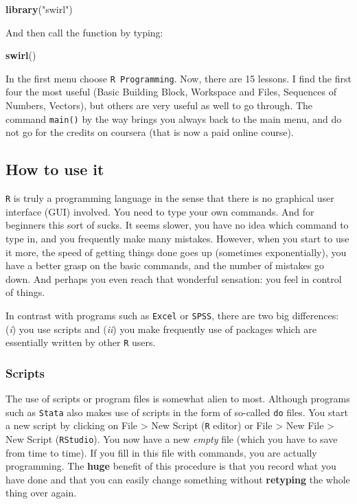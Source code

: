 \documentclass[]{article}
\newenvironment{Shaded}{\begin{snugshade}}{\end{snugshade}}
\newcommand{\KeywordTok}[1]{\textcolor[rgb]{0.13,0.29,0.53}{\textbf{#1}}}
\newcommand{\StringTok}[1]{\textcolor[rgb]{0.31,0.60,0.02}{#1}}
\newcommand{\NormalTok}[1]{#1}
\theoremstyle{definition}
\theoremstyle{definition}
\theoremstyle{definition}
\theoremstyle{remark}
\begin{document}
\begin{Shaded}
\begin{Highlighting}[]
\KeywordTok{library}\NormalTok{(}\StringTok{"swirl"}\NormalTok{)}
\end{Highlighting}
\end{Shaded}

And then call the function by typing:

\begin{Shaded}
\begin{Highlighting}[]
\KeywordTok{swirl}\NormalTok{()}
\end{Highlighting}
\end{Shaded}

In the first menu choose \texttt{R\ Programming}. Now, there are 15
lessons. I find the first four the most useful (Basic Building Block,
Workspace and Files, Sequences of Numbers, Vectors), but others are very
useful as well to go through. The command \texttt{main()} by the way
brings you always back to the main menu, and do not go for the credits
on coursera (that is now a paid online course).

\subsection{How to use it}\label{how-to-use-it}

\texttt{R} is truly a programming language in the sense that there is no
graphical user interface (GUI) involved. You need to type your own
commands. And for beginners this sort of sucks. It seems slower, you
have no idea which command to type in, and you frequently make many
mistakes. However, when you start to use it more, the speed of getting
things done goes up (sometimes exponentially), you have a better grasp
on the basic commands, and the number of mistakes go down. And perhaps
you even reach that wonderful sensation: you feel in control of things.

In contrast with programs such as \texttt{Excel} or \texttt{SPSS}, there
are two big differences: (\emph{i}) you use scripts and (\emph{ii}) you
make frequently use of packages which are essentially written by other
\texttt{R} users.

\subsubsection{Scripts}\label{subsec:scripts}

The use of scripts or program files is somewhat alien to most. Although
programs such as \texttt{Stata} also makes use of scripts in the form of
so-called \texttt{do} files. You start a new script by clicking on File
\textgreater{} New Script (\texttt{R} editor) or File \textgreater{} New
File \textgreater{} New Script (\texttt{RStudio}). You now have a new
\emph{empty} file (which you have to save from time to time). If you
fill in this file with commands, you are actually programming. The
\textbf{huge} benefit of this procedure is that you record what you have
done and that you can easily change something without \textbf{retyping}
the whole thing over again.
\end{document}
